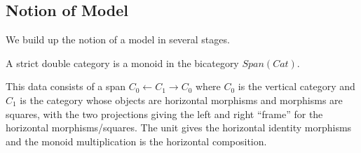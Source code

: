 \documentclass{llncs}
\begin{document}

\subsection{Notion of Model}


We build up the notion of a model in several stages.

\begin{definition}
  A strict double category is a monoid in the bicategory $Span(Cat)$.
\end{definition}

This data consists of a span $C_0 \leftarrow C_1 \rightarrow C_0$
where $C_0$ is the vertical category and $C_1$ is the category whose
objects are horizontal morphisms and morphisms are squares, with the
two projections giving the left and right ``frame'' for the horizontal
morphisms/squares. The unit gives the horizontal identity morphisms
and the monoid multiplication is the horizontal composition.
\end{document}
